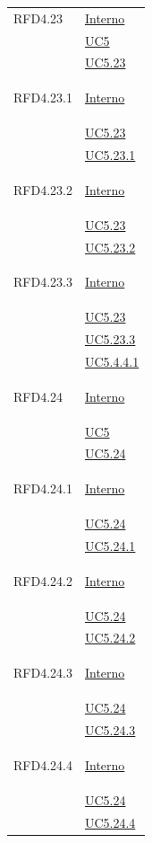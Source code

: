 \begin{longtable}{|>{\centering}m{5cm}|m{5cm}<{\centering}|}
\hypertarget{RFD4.23}{RFD4.23}  & \hyperlink{Interno}{Interno}\\
&\hyperref[UC5]{UC5}\\
&\hyperref[UC5.23]{UC5.23}\\ \hline

\hypertarget{RFD4.23.1}{RFD4.23.1} &  \hyperlink{Interno}{Interno}\\
&\hyperref[UC5.23]{UC5.23}\\
&\hyperref[UC5.23.1]{UC5.23.1}\\ \hline

\hypertarget{RFD4.23.2}{RFD4.23.2} & \hyperlink{Interno}{Interno}\\
&\hyperref[UC5.23]{UC5.23}\\
&\hyperref[UC5.23.2]{UC5.23.2}\\ \hline

\hypertarget{RFD4.23.3}{RFD4.23.3} & \hyperlink{Interno}{Interno}\\
&\hyperref[UC5.23]{UC5.23}\\
&\hyperref[UC5.23.3]{UC5.23.3}\\ 
&\hyperref[UC5.4.4.1]{UC5.4.4.1}\\ \hline

\hypertarget{RFD4.24}{RFD4.24} & \hyperlink{Interno}{Interno}\\
&\hyperref[UC5]{UC5}\\
&\hyperref[UC5.24]{UC5.24}\\ \hline

\hypertarget{RFD4.24.1}{RFD4.24.1} &   \hyperlink{Interno}{Interno}\\
&\hyperref[UC5.24]{UC5.24}\\
&\hyperref[UC5.24.1]{UC5.24.1}\\ \hline

\hypertarget{RFD4.24.2}{RFD4.24.2} &  \hyperlink{Interno}{Interno}\\
&\hyperref[UC5.24]{UC5.24}\\
&\hyperref[UC5.24.2]{UC5.24.2}\\ \hline

\hypertarget{RFD4.24.3}{RFD4.24.3} &  \hyperlink{Interno}{Interno}\\
&\hyperref[UC5.24]{UC5.24}\\
&\hyperref[UC5.24.3]{UC5.24.3}\\ \hline

\hypertarget{RFD4.24.4}{RFD4.24.4} &  \hyperlink{Interno}{Interno}\\
&\hyperref[UC5.24]{UC5.24}\\
&\hyperref[UC5.24.4]{UC5.24.4}\\ \hline


\end{longtable}
